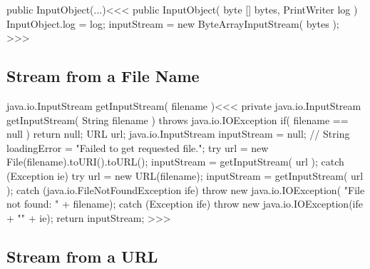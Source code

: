 \documentclass{article}
\begin{document}
\<public InputObject(...)\><<<
public InputObject( byte [] bytes, PrintWriter log ){
   InputObject.log = log;
   inputStream = new ByteArrayInputStream( bytes );
}
>>>



\subsection{Stream from a  File Name}



\<java.io.InputStream getInputStream( filename )\><<<
private java.io.InputStream getInputStream(
                                      String filename )
                                   throws java.io.IOException{
   if( filename == null ){ return null; }
   URL url;
   java.io.InputStream inputStream = null;
//   String loadingError = "Failed to get requested file.";
   try {
      url = new File(filename).toURI().toURL();
      inputStream =  getInputStream( url );
   } catch (Exception ie) {
       try {
           url = new URL(filename);
           inputStream =  getInputStream( url );
       } catch (java.io.FileNotFoundException ife) {
           throw new java.io.IOException(
              "File not found: " + filename);
       } catch (Exception ife) {
           throw new java.io.IOException(ife + "\n" + ie);
   }   }
   return inputStream;
}
>>>


\subsection{Stream from a URL}
\end{document}
